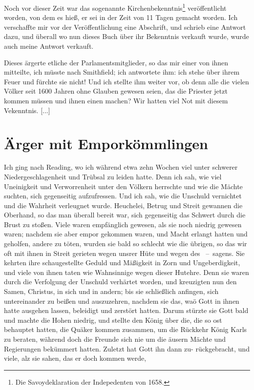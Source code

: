 Noch vor dieser Zeit war das sogenannte 
Kirchenbekenntnis\footnote{Die Savoydeklaration der 
Indepedenten von 1658.}
veröffentlicht worden, von dem es hieß, er sei in der Zeit von
11 Tagen gemacht worden. Ich verschaffte mir vor der 
Veröffentlichung eine Abschrift, und schrieb eine Antwort dazu, und
überall wo nun dieses Buch über ihr Bekenntnis verkauft wurde,
wurde auch meine Antwort verkauft.  

Dieses ärgerte etliche der
Parlamentsmitglieder, so das mir einer von ihnen mitteilte, ich
müsste nach Smithfield; ich antwortete ihm: 
ich stehe über ihrem
Feuer und fürchte sie nicht! Und ich stellte ihm weiter vor, ob
denn alle die vielen Völker seit 1600 Jahren ohne Glauben 
gewesen seien, das die Priester jetzt kommen müssen und ihnen einen
machen?  Wir hatten viel Not mit diesem Vekenntnis. [...]

\section{Ärger mit Emporkömmlingen}

Ich ging nach Reading, wo ich während etwa zehn Wochen
viel unter schwerer Niedergeschlagenheit und Trübsal zu leiden
hatte. Denn ich sah, wie viel Uneinigkeit und Verworrenheit 
unter den Völkern herrschte und wie die Mächte suchten, sich
gegenseitig aufzufressen. Und ich sah, wie die Unschuld vernichtet
und die Wahrheit verleugnet wurde. Heuchelei, Betrug und
Streit gewannen die Oberhand, so das man überall bereit war,
sich gegenseitig das Schwert durch die Brust zu stoßen. Viele
waren empfänglich gewesen, als sie noch niedrig gewesen waren;
nachdem sie aber empor gekommen waren, und Macht erlangt
hatten und geholfen, andere zu töten, wurden sie bald so
schlecht wie die übrigen, so das wir oft mit ihnen in Streit 
gerieten wegen unsrer Hüte und wegen des 
~--~sagens. Sie
kehrten ihre schaugestellte Geduld und Mäßigkeit in Zorn und
Ungeberdigkeit, und viele von ihnen taten wie Wahnsinnige wegen
dieser Hutehre. Denn sie waren durch die Verfolgung der 
Unschuld verhärtet worden, und kreuzigten nun den Samen,
Christus, in sich und 
in andern; bis sie schließlich anfingen, sich
untereinander zu beißen und auszuzehren, nachdem sie das, waö
Gott in ihnen hatte ausgehen lassen, beleidigt und zerstört hatten.
Darum stürzte sie Gott bald und machte die Hohen niedrig, und
stellte den König über die, die so ost behauptet hatten, die Quäker
kommen zusammen, um die Rückkehr König Karls zu beraten,
während doch die Freunde sich nie um die äusern Mächte und
Regierungen bekümmert hatten. Zuletzt hat Gott ihn dann zu-
rückgebracht, und viele, alz sie sahen, das er doch kommen werde,


